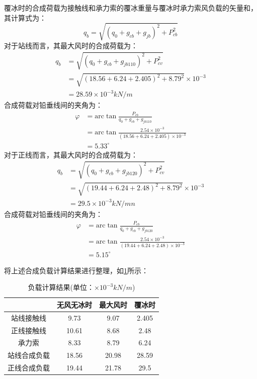 覆冰时的合成荷载为接触线和承力索的覆冰重量与覆冰时承力索风负载的矢量和，其计算式为：
$$
q_{b}=\sqrt{(q_0+g_{cb}+g_{jb})^2+P_{cb}^{2}}
$$
对于站线而言，其最大风时的合成荷载为：
\begin{align*}
	q_b&=\sqrt{\left( q_0+g_{cb}+g_{jb110} \right) ^2+P_{cv}^{2}}
	\\
	&=\sqrt{\left( 18.56+6.24+2.405 \right) ^2+8.79^2}\times 10^{-3}
	\\
	&=28.59\times 10^{-3}kN/m
\end{align*}
合成荷载对铅垂线间的夹角为：
\begin{align*}
	\varphi &=\mathrm{arc}\tan \frac{P_{cb}}{q_0+g_{cb}+g_{jb110}}
	\\
	&=\mathrm{arc}\tan \frac{2.54\times 10^{-3}}{\left( 18.56+6.24+2.405 \right) \times 10^{-3}}
	\\
	&=5.33^{\circ}
\end{align*}
对于正线而言，其最大风时的合成荷载为：
\begin{align*}
	q_b&=\sqrt{\left( q_0+g_{cb}+g_{jb120} \right) ^2+P_{cv}^{2}}
	\\
	&=\sqrt{\left( 19.44+6.24+2.48 \right) ^2+8.79^2}\times 10^{-3}
	\\
	&=29.5\times 10^{-3}kN/mn
\end{align*}
合成荷载对铅垂线间的夹角为：
\begin{align*}
	\varphi &=\mathrm{arc}\tan \frac{P_{cb}}{q_0+g_{cb}+g_{jb120}}
	\\
	&=\mathrm{arc}\tan \frac{2.54\times 10^{-3}}{\left( 19.44+6.24+2.48 \right) \times 10^{-3}}
	\\
	&=5.15^{\circ}
\end{align*}

将上述合成负载计算结果进行整理，如\ref*{tab:负载计算结果}所示：
\begin{table}[h]
	\centering
	\caption{负载计算结果(单位：$\times 10^{-3} kN / m$)}
	\label{tab:负载计算结果}

		\begin{tabular}{|c|c|c|c|}
			\hline
			& 无风无冰时 & 最大风时  & 覆冰时   \\ \hline
			站线接触线  & 9.73  & 9.07  & 2.405 \\ \hline
			正线接触线  & 10.61 & 8.68  & 2.48  \\ \hline
			承力索    & 8.33  & 8.79  & 6.24  \\ \hline
			站线合成负载 & 18.56 & 20.98 & 28.59 \\ \hline
			正线合成负载 & 19.44 & 21.78 & 29.5  \\ \hline
		\end{tabular}%
	
\end{table}

